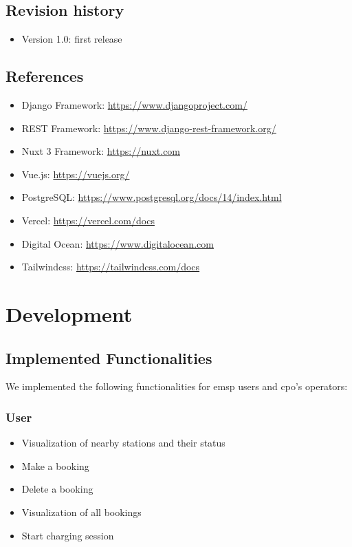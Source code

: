 \documentclass[table, 12pt]{article}
\begin{document}
\subsection{Revision history}
\begin{itemize}
    \item Version 1.0: first release
    
\end{itemize}

\subsection{References}
\begin{itemize}
    \item Django Framework: \url{https://www.djangoproject.com/}
    \item REST Framework: \url{https://www.django-rest-framework.org/}
    \item Nuxt 3 Framework: \url{https://nuxt.com}
    \item Vue.js: \url{https://vuejs.org/}
    \item PostgreSQL: \url{https://www.postgresql.org/docs/14/index.html}
    \item Vercel: \url{https://vercel.com/docs}
    \item Digital Ocean: \url{https://www.digitalocean.com}
    \item Tailwindcss: \url{https://tailwindcss.com/docs}
\end{itemize}

\newpage
\section{Development}
\subsection{Implemented Functionalities}
We implemented the following functionalities for emsp users and cpo's operators:

\subsubsection*{User}
\begin{itemize}
    \item Visualization of nearby stations and their status
    \item Make a booking
    \item Delete a booking
    \item Visualization of all bookings
    \item Start charging session
\end{itemize}
\end{document}
